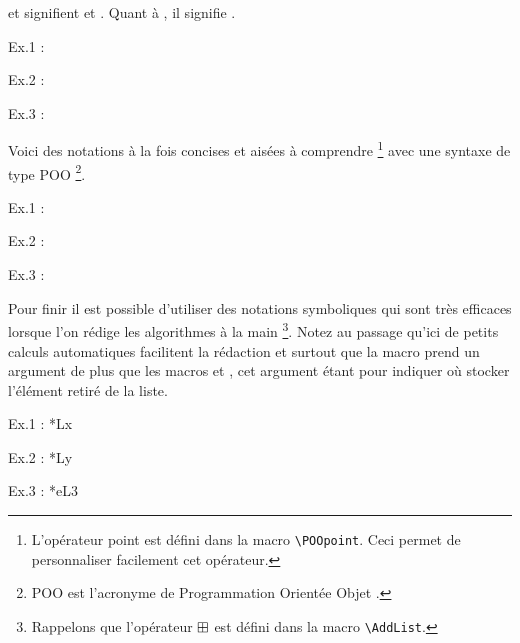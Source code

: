 \documentclass[12pt,a4paper]{article}
\begin{document}

 et  signifient  et .
Quant à , il signifie .


\begin{latexex}
Ex.1 : 

Ex.2 : 

Ex.3 : 
\end{latexex}





Voici des notations à la fois concises et aisées à comprendre
\footnote{
	L'opérateur point \POOpoint{} est défini dans la macro \texttt{\textbackslash{}POOpoint}. 
	Ceci permet de personnaliser facilement cet opérateur.
}
avec une syntaxe de type POO
\footnote{
	\og POO \fg{} est l'acronyme de \og Programmation Orientée Objet \fg{}.
}.


\begin{latexex}
Ex.1 : 

Ex.2 : 

Ex.3 : 
\end{latexex}





Pour finir il est possible d'utiliser des notations symboliques qui sont très efficaces lorsque l'on rédige les algorithmes à la main
\footnote{
	Rappelons que l'opérateur $\mathbin{\boxplus}$ est défini dans la macro \texttt{\textbackslash{}AddList}.
}.
Notez au passage qu'ici de petits calculs automatiques facilitent la rédaction et surtout que la macro  prend un argument de plus que les macros  et , cet argument étant pour indiquer où stocker l'élément retiré de la liste.


\begin{latexex}
Ex.1 : \Append**{L}{x}

Ex.2 : \Prepend**{L}{y}

Ex.3 : \PopAt**{e}{L}{3}
\end{latexex}
\end{document}
